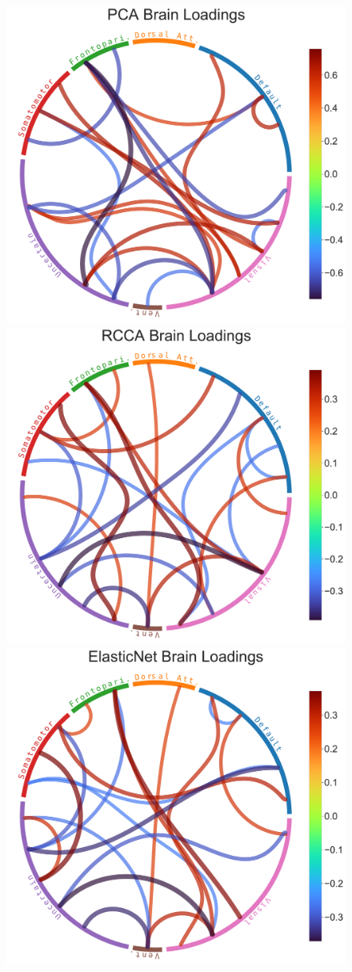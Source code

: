 \begin{figure}
\centering
\includegraphics[width=0.68\linewidth]{figures/regularization/hcp/PCA brain loadings.pdf}
\includegraphics[width=0.68\linewidth]{figures/regularization/hcp/RCCA brain loadings.pdf}
\includegraphics[width=0.68\linewidth]{figures/regularization/hcp/ElasticNet brain loadings.pdf}

\end{figure}
